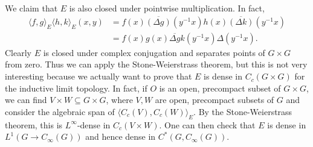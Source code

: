 \documentclass[12pt]{report}
\theoremstyle{definition}
\begin{document}
    We claim that $E$ is also closed under pointwise multiplication. In fact,
\begin{align*}
    \langle f, g\rangle_E\langle h, k\rangle_E(x, y) &= f(x)\overline{(\Delta g)}(y^{-1}x) h(x) \overline{(\Delta k)}(y^{-1}x)\\
        &= f(x)g(x) \overline{\Delta g}k(y^{-1}x) \Delta(y^{-1}x). 
\end{align*}
    Clearly $E$ is closed under complex conjugation and separates points of $G \times G$ from zero. Thus we can apply the Stone-Weierstrass theorem, but this is not very interesting because we actually want to prove that $E$ is dense in $C_c(G \times G)$ for the inductive limit topology. In fact, if $O$ is an open, precompact subset of $G \times G$, we can find $V \times W \subseteq G \times G$, where $V,W$ are open, precompact subsets of $G$ and consider the algebraic span of $\langle C_c(V), C_c(W)\rangle_E$. By the Stone-Weierstrass theorem, this is $L^\infty$-dense in $C_c(V \times W)$. One can then check that $E$ is dense in $L^1(G \to C_\infty(G))$ and hence dense in $C^*(G, C_\infty(G))$.
\end{document}
